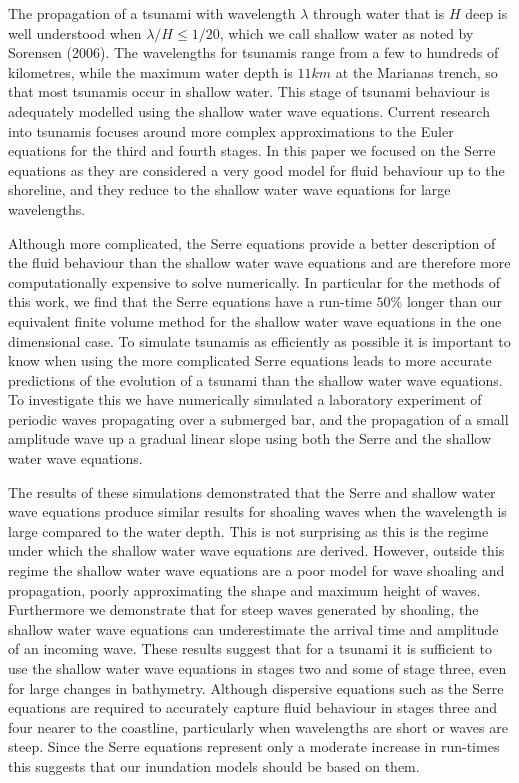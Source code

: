 The propagation of a tsunami with wavelength $\lambda$ through water that is $H$ deep is well understood when $\lambda / H \le 1/ 20$, which we call shallow water as noted by Sorensen (2006). The wavelengths for tsunamis range from a few to hundreds of kilometres, while the maximum water depth is $11km$ at the Marianas trench, so that most tsunamis occur in shallow water. This stage of tsunami behaviour is adequately modelled using the shallow water wave equations. Current research into tsunamis focuses around more complex approximations to the Euler equations for the third and fourth stages. In this paper we focused on the Serre equations as they are considered a very good model for fluid behaviour up to the shoreline, and they reduce to the shallow water wave equations for large wavelengths. 

Although more complicated, the Serre equations provide a better description of the fluid behaviour than the shallow water wave equations and are therefore more computationally expensive to solve numerically. In particular for the methods of this work, we find that the Serre equations have a run-time $50\%$ longer than our equivalent finite volume method for the shallow water wave equations in the one dimensional case. To simulate tsunamis as efficiently as possible it is important to know when using the more complicated Serre equations leads to more accurate predictions of the evolution of a tsunami than the shallow water wave equations. To investigate this we have numerically simulated a laboratory experiment of periodic waves propagating over a submerged bar, and the propagation of a small amplitude wave up a gradual linear slope using both the Serre and the shallow water wave equations.

The results of these simulations demonstrated that the Serre and shallow water wave equations produce similar results for shoaling waves when the wavelength is large compared to the water depth. This is not surprising as this is the regime under which the shallow water wave equations are derived. However, outside this regime the shallow water wave equations are a poor model for wave shoaling and propagation, poorly approximating the shape and maximum height of waves. Furthermore we demonstrate that for steep waves generated by shoaling, the shallow water wave equations can underestimate the arrival time and amplitude of an incoming wave. These results suggest that for a tsunami it is sufficient to use the shallow water wave equations in stages two and some of stage three, even for large changes in bathymetry. Although dispersive equations such as the Serre equations are required to accurately capture fluid behaviour in stages three and four nearer to the coastline, particularly when wavelengths are short or waves are steep. Since the Serre equations represent only a moderate increase in run-times this suggests that our inundation models should be based on them.
\newpage

